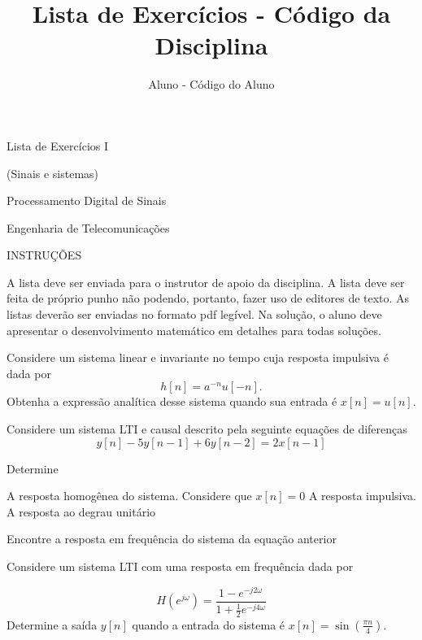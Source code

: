 \documentclass[12pt,a4paper]{article}
\author{Aluno - Código do Aluno}
\title{Lista de Exercícios - Código da Disciplina}
\date{}
\begin{document}
	\begin{center}
    {\large Lista de Exercícios I\par (Sinais e sistemas) \par}
    {\large Processamento Digital de Sinais\par}
    {\large Engenharia de Telecomunicações \par}
	\end{center}

\begin{center}
   INSTRUÇÕES
\end{center} 
\begin{subitemize}
    \thisone A lista deve ser enviada para o instrutor de apoio da disciplina.
    \thisone A lista deve ser feita de próprio punho não podendo, portanto, fazer uso de editores de texto.
    \thisone  As listas deverão ser enviadas  no formato pdf legível.
    \thisone Na solução, o aluno deve apresentar o desenvolvimento matemático em detalhes para todas soluções.
\end{subitemize}
\problem Considere um sistema linear e invariante no tempo cuja resposta impulsiva é dada por
\begin{equation}
    h\left[ n \right] = a^{-n} u[-n].
\end{equation}
Obtenha a expressão analítica desse sistema quando sua entrada é \(x\left[ n \right] = u\left[ n \right]\).

\answer 

\problem Considere um sistema LTI e causal descrito pela  seguinte equações de diferenças
\begin{equation}
    y[n] - 5y[n-1] + 6y[n-2] = 2x[n-1]
\end{equation}

Determine

\subproblem A resposta homogênea do sistema. Considere que \(x[n] = 0\)
\subproblem A resposta impulsiva.
\subproblem A resposta ao degrau unitário

\answer

\problem Encontre a resposta em frequência do sistema da equação anterior

\problem Considere um sistema LTI com uma resposta em frequência dada por

\begin{equation}
    H(e^{j\omega}) = \frac{1 - e^{-j2\omega}}{1 + \frac{1}{2}e^{-j4\omega}}
\end{equation}
Determine a saída \(y [n]\) quando a entrada do sistema é \(x[n] = \sin{\left( \frac{\pi n}{4} \right)}\).
\end{document}
